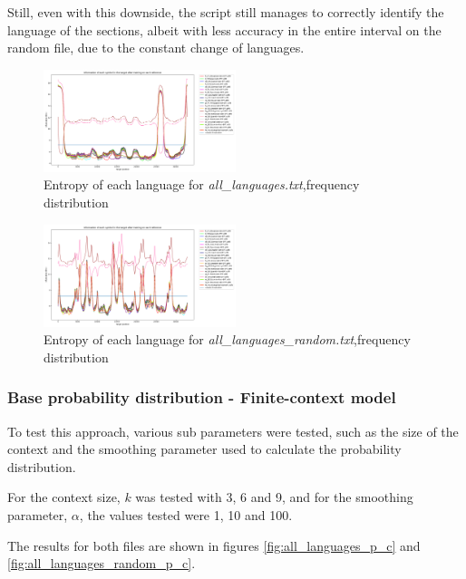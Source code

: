 \documentclass{article}
\begin{document}
Still, even with this downside, the script still manages to correctly identify the language of the sections, albeit with less accuracy in the entire interval on the random file,
due to the constant change of languages.

\begin{figure}
    \centering
    \includegraphics[width=0.5\textwidth]{../results/all_languages/-p_f.png}
    \caption{Entropy of each language for \textit{all\_languages.txt},frequency distribution}
    \label{fig:all_languages_p_f}
\end{figure}

\begin{figure}
    \centering
    \includegraphics[width=0.5\textwidth]{../results/all_languages_random/-p_f.png}
    \caption{Entropy of each language for \textit{all\_languages\_random.txt},frequency distribution}
    \label{fig:all_languages_random_p_f}
\end{figure}

\subsubsection{Base probability distribution - Finite-context model}
\label{subsubsec:results_locate_lang_first_order_fcm}

To test this approach, various sub parameters were tested, such as the size of the context and the smoothing parameter used to calculate the probability distribution.

For the context size, $k$ was tested with 3, 6 and 9, and for the smoothing parameter, $\alpha$, the values tested were 1, 10 and 100.

The results for both files are shown in figures \ref{fig:all_languages_p_c} and \ref{fig:all_languages_random_p_c}.
\end{document}
